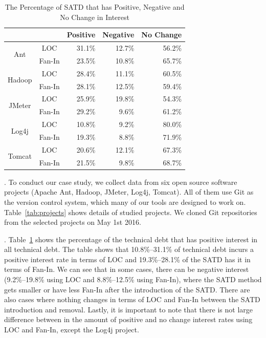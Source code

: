 \documentclass[10pt, conference]{IEEEtran}
\newcommand{\smallsection}[1]{\vspace{1mm}\noindent {\bf #1}.\hspace{2mm}}
\begin{document}
\begin{table}[tb]
  \caption{The Percentage of SATD that has Positive, Negative and No Change in Interest}
  \label{tab:percentage}
  \centering

  \begin{tabular}{cc|rrr}
  \hline
        & & \textbf{Positive} & \textbf{Negative} & \textbf{No Change} \\
  \hline
\multirow{2}{*}{Ant} &  LOC  &  31.1\%  &  12.7\% & 56.2\%\\
                   & Fan-In  &  23.5\%  &  10.8\% & 65.7\%\\
  \hline
\multirow{2}{*}{Hadoop} &  LOC  &  28.4\%  &  11.1\% & 60.5\%\\
                      & Fan-In  &  28.1\%  &  12.5\% & 59.4\%\\
  \hline
\multirow{2}{*}{JMeter} &  LOC  &  25.9\%  &  19.8\% & 54.3\%\\
                      & Fan-In  &  29.2\%  &  9.6\% & 61.2\%\\
  \hline
\multirow{2}{*}{Log4j} &  LOC  &  10.8\%  &  9.2\% & 80.0\%\\
                     & Fan-In  &  19.3\%  &  8.8\% & 71.9\%\\
  \hline
\multirow{2}{*}{Tomcat} &  LOC &  20.6\%  &  12.1\% & 67.3\%\\
                      & Fan-In &  21.5\%  &  9.8\% & 68.7\%\\
  \hline
  \end{tabular}
\end{table}

\smallsection{Datasets}
To conduct our case study, we collect data from six open source software projects (Apache Ant, Hadoop, JMeter, Log4j, Tomcat). All of them use Git as the version control system, which many of our tools are designed to work on. Table~\ref{tab:projects} shows details of studied projects. We cloned Git repositories from the selected projects on May 1st 2016. 

\smallsection{Results}
Table~\ref{tab:percentage} shows the percentage of the technical debt that has positive interest in all technical debt. The table shows that 10.8\%--31.1\% of technical debt incurs a positive interest rate in terms of LOC and 19.3\%--28.1\% of the SATD has it in terms of Fan-In. We can see that in some cases, there can be negative interest (9.2\%--19.8\% using LOC and 8.8\%--12.5\% using Fan-In), where the SATD method gets smaller or have less Fan-In after the introduction of the SATD. There are also cases where nothing changes in terms of LOC and Fan-In between the SATD introduction and removal. Lastly, it is important to note that there is not large difference between in the amount of positive and no change interest rates using LOC and Fan-In, except the Log4j project. 
\end{document}
